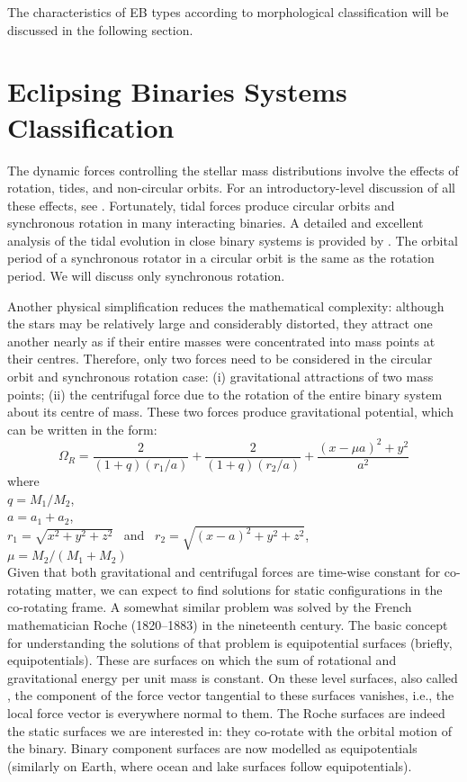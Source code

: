 The characteristics of EB types according to morphological classification will be
discussed in the following section.


\section{Eclipsing Binaries Systems Classification}
\label{EB_classif}
The dynamic forces controlling the stellar mass distributions involve the effects of
rotation, tides, and non-circular orbits. For an introductory-level discussion of all
these effects, see \cite{wilson1974}. Fortunately, tidal forces produce circular orbits and
synchronous rotation in many interacting binaries. A detailed and excellent analysis
of the tidal evolution in close binary systems is provided by \cite{hut1981}. The orbital
period of a synchronous rotator in a circular orbit is the same as the rotation period.
We will discuss only synchronous rotation.

Another physical simplification reduces the mathematical complexity: although
the stars may be relatively large and considerably distorted, they attract one another
nearly as if their entire masses were concentrated into mass points at their centres. 
Therefore, only two forces need to be considered in the circular orbit and
synchronous rotation case: (i) gravitational attractions of two mass points;
(ii) the centrifugal force due to the rotation of the entire binary system about its centre of mass.
These two forces produce gravitational potential, which can be written in the form:
\begin{equation} \label{eq:roche_pot}  %
\Omega_{R} = \dfrac{2}{(1+q)(r_{1}/a)}+\dfrac{2}{(1+q)(r_{2}/a)} + \dfrac{(x-\mu a)^{2}+y^{2}}{a^{2}}
\end{equation}
where\\ 
$q = M_{1}/M_{2}$,\\ 
$a=a_{1}+a_{2}$, \\
$r_{1}= \sqrt{x^{2}+y^{2}+z^{2}}$ ~and~ $r_{2}= \sqrt{(x-a)^{2}+y^{2}+z^{2}}$, \\
$\mu = M_{2}/(M_{1}+M_{2})$ \\

Given that both gravitational and centrifugal forces are time-wise constant for co-rotating 
matter, we can expect to find solutions for static configurations in the co-rotating frame. 
A somewhat similar problem was solved by the French mathematician Roche (1820--1883) in the nineteenth century. 
The basic concept for understanding the solutions of that problem is equipotential surfaces
(briefly, equipotentials). These are surfaces on which the sum of rotational and
gravitational energy per unit mass is constant. On these level surfaces, also called
, the component of the force vector tangential to these surfaces vanishes, i.e., 
the local force vector is everywhere normal to them. The Roche surfaces
are indeed the static surfaces we are interested in: they co-rotate with the orbital
motion of the binary. Binary component surfaces are now modelled as equipotentials
(similarly on Earth, where ocean and lake surfaces follow equipotentials).

